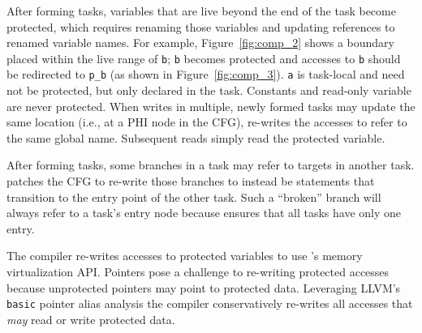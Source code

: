 After forming tasks, variables that are live beyond the end of the task become
protected, which requires renaming those variables and updating references to
renamed variable names.  
%
For example, Figure~\ref{fig:comp_2} shows a boundary placed within the live
range of {\tt b}; {\tt b} becomes protected and accesses to {\tt b} should be
redirected to {\tt p\_b} (as shown in Figure~\ref{fig:comp_3}).  {\tt a} is
task-local and need not be protected, but only declared in the task. Constants
and read-only variable are never protected.
%
When writes in multiple, newly formed tasks may update the same location (i.e.,
at a PHI node in the CFG), \sys re-writes the accesses to refer to the same global
name.   Subsequent reads simply read the protected variable. 

After forming tasks, some branches in a task may refer to targets in another
task. \sys patches the CFG to re-write those branches to instead be \transition
statements that transition to the entry point of the other task. Such a
``broken'' branch will always refer to a task's entry node because \sys ensures
that all tasks have only one entry. 

The compiler re-writes accesses to protected variables to use \sys's memory
virtualization API. Pointers pose a challenge to re-writing protected accesses
because unprotected pointers may point to protected data.  Leveraging LLVM's
{\tt basic} pointer alias analysis the compiler conservatively re-writes all
accesses that {\em may} read or write protected data. 


